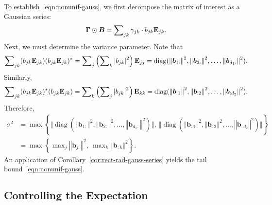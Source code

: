 \documentclass[11pt,letterpaper,twoside,reqno,draft]{amsart}
\theoremstyle{remark}
\numberwithin{equation}{section}
\numberwithin{thm}{section}
\begin{document}
To establish~\eqref{eqn:nonunif-gauss}, we first decompose the matrix of interest as a Gaussian series:
$$
{\bm{{\Gamma}}} \odot {\bm{{B}}} = \sum\nolimits_{jk} \gamma_{jk} \cdot b_{jk} {\bf E}_{jk}.
$$
Next, we must determine the variance parameter.  Note that
$$
\sum\nolimits_{jk} (b_{jk} {\bf E}_{jk})(b_{jk} {\bf E}_{jk})^{*} 
	= \sum\nolimits_{j} \left(\sum\nolimits_k {{{\left\vert {{{b_{jk}}}} \right\vert}}^2}\right) {\bf E}_{jj}
	= {\operatorname{diag}}( {{\left\Vert {{{ {\bm{{b}}}_{1:}}}} \right\Vert}^2}, {{\left\Vert {{{{\bm{{b}}}_{2:}}}} \right\Vert}^2},
	\dots, {{\left\Vert {{{{\bm{{b}}}_{d_1:}}}} \right\Vert}^2} ).
$$
Similarly,
$$
\sum\nolimits_{jk} (b_{jk} {\bf E}_{jk})^{*}(b_{jk} {\bf E}_{jk})
	= \sum\nolimits_{k} \left(\sum\nolimits_j {{{\left\vert {{{b_{jk}}}} \right\vert}}^2}\right) {\bf E}_{kk}
	= {\operatorname{diag}}( {{\left\Vert {{{ {\bm{{b}}}_{:1}}}} \right\Vert}^2}, {{\left\Vert {{{{\bm{{b}}}_{:2}}}} \right\Vert}^2},
	\dots, {{\left\Vert {{{{\bm{{b}}}_{:d_2}}}} \right\Vert}^2} ).
$$
Therefore,
\begin{align*}
\sigma^2 &= \max\left\{ {{\bigl\Vert {{ {\operatorname{diag}}( {{\left\Vert {{{ {\bm{{b}}}_{1:}}}} \right\Vert}^2}, {{\left\Vert {{{{\bm{{b}}}_{2:}}}} \right\Vert}^2},
	\dots, {{\left\Vert {{{{\bm{{b}}}_{d_1:}}}} \right\Vert}^2} ) }} \bigr\Vert}_{{}}}, \
	{{\bigl\Vert {{ {\operatorname{diag}}( {{\left\Vert {{{ {\bm{{b}}}_{:1}}}} \right\Vert}^2}, {{\left\Vert {{{{\bm{{b}}}_{:2}}}} \right\Vert}^2},
	\dots, {{\left\Vert {{{{\bm{{b}}}_{:d_2}}}} \right\Vert}^2} ) }} \bigr\Vert}_{{}}} \right\} \\
	&= \max\left\{ \max\nolimits_j {{\left\Vert {{{{\bm{{b}}}_{j:}}}} \right\Vert}^2}, \
		\max\nolimits_k {{\left\Vert {{{{\bm{{b}}}_{:k}}}} \right\Vert}^2} \right\}.
\end{align*}
An application of Corollary~\ref{cor:rect-rad-gauss-series} yields the tail bound~\eqref{eqn:nonunif-gauss}.  

\subsection{Controlling the Expectation} \label{sec:gauss-expect}
\end{document}
